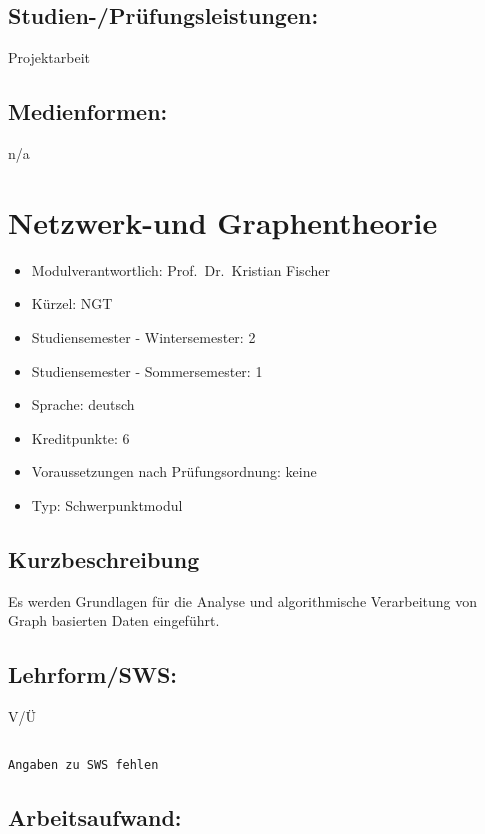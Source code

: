 \section*{Studien-/Prüfungsleistungen:}\label{studien-pruxfcfungsleistungen-10}

Projektarbeit

\section*{Medienformen:}\label{medienformen-10}

n/a

\chapter{Netzwerk-und Graphentheorie}\label{netzwerk-und-graphentheorie}

\begin{itemize}
\tightlist
\item
  Modulverantwortlich: Prof.~Dr.~Kristian Fischer
\item
  Kürzel: NGT
\item
  Studiensemester - Wintersemester: 2
\item
  Studiensemester - Sommersemester: 1
\item
  Sprache: deutsch
\item
  Kreditpunkte: 6
\item
  Voraussetzungen nach Prüfungsordnung: keine
\item
  Typ: Schwerpunktmodul
\end{itemize}

\section*{Kurzbeschreibung}\label{kurzbeschreibung-5}

Es werden Grundlagen für die Analyse und algorithmische Verarbeitung von
Graph basierten Daten eingeführt.

\section*{Lehrform/SWS:}\label{lehrformsws-11}

V/Ü

\begin{verbatim}

Angaben zu SWS fehlen
\end{verbatim}

\section*{Arbeitsaufwand:}\label{arbeitsaufwand-17}

